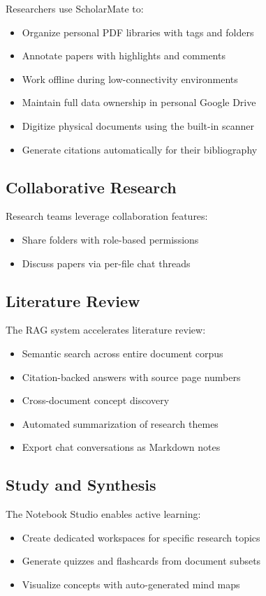 \documentclass[conference]{IEEEtran}
\begin{document}
Researchers use ScholarMate to:
\begin{itemize}
\item Organize personal PDF libraries with tags and folders
\item Annotate papers with highlights and comments
\item Work offline during low-connectivity environments
\item Maintain full data ownership in personal Google Drive
\item Digitize physical documents using the built-in scanner
\item Generate citations automatically for their bibliography
\end{itemize}

\subsection{Collaborative Research}

Research teams leverage collaboration features:
\begin{itemize}
\item Share folders with role-based permissions
\item Discuss papers via per-file chat threads
\end{itemize}

\subsection{Literature Review}

The RAG system accelerates literature review:
\begin{itemize}
\item Semantic search across entire document corpus
\item Citation-backed answers with source page numbers
\item Cross-document concept discovery
\item Automated summarization of research themes
\item Export chat conversations as Markdown notes
\end{itemize}

\subsection{Study and Synthesis}

The Notebook Studio enables active learning:
\begin{itemize}
\item Create dedicated workspaces for specific research topics
\item Generate quizzes and flashcards from document subsets
\item Visualize concepts with auto-generated mind maps
\end{itemize}
\end{document}
